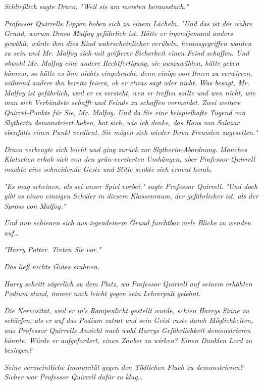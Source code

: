 {\emph{Schließlich sagte Draco, "Weil sie am meisten herausstach."}

\emph{Professor Quirrells Lippen hoben sich zu einem Lächeln. "Und das ist der wahre Grund, warum Draco Malfoy gefährlich ist. Hätte er irgendjemand anders gewählt, würde ihm dies Kind wahrscheinlicher verübeln, herausgegriffen worden zu sein und Mr. Malfoy sich mit größerer Sicherheit einen Feind schaffen. Und obwohl Mr. Malfoy eine andere Rechtfertigung, sie auszuwählen, hätte geben können, so hätte es ihm nichts eingebracht, denn einige von Ihnen zu verwirren, während andere ihn bereits feiern, ob er etwas sagt oder nicht. Was besagt, Mr. Malfoy ist gefährlich, weil er es versteht, wen er treffen sollte und wen nicht, wie man sich Verbündete schafft und Feinde zu schaffen vermeidet. Zwei weitere Quirrel-Punkte für Sie, Mr. Malfoy. Und da Sie eine beispielhafte Tugend von Slytherin demonstriert haben, hat sich, wie ich denke, das Haus von Salazar ebenfalls einen Punkt verdient. Sie mögen sich wieder Ihren Freunden zugesellen."}

\emph{Draco verbeugte sich leicht und ging zurück zur Slytherin-Abordnung. Manches Klatschen erhob sich von den grün-verzierten Umhängen, aber Professor Quirrell machte eine schneidende Geste und Stille senkte sich erneut herab.}

\emph{"Es mag scheinen, als sei unser Spiel vorbei," sagte Professor Quirrell.} \emph{"Und doch gibt es einen einzigen Schüler in diesem Klassenraum, der gefährlicher ist, als der Spross von Malfoy."}

\emph{Und} \emph{\emph{nun}} \emph{schienen sich aus irgendeinem Grund furchtbar viele Blicke zu wenden auf…}

\emph{"Harry Potter. Treten Sie vor."}

\emph{Das ließ nichts Gutes erahnen.}

\emph{Harry schritt zögerlich zu dem Platz, wo Professor Quirrell auf seinem erhöhten Podium stand, immer noch leicht gegen sein Lehrerpult gelehnt.}

\emph{Die Nervosität, weil er in's Rampenlicht gestellt wurde, schien Harrys Sinne zu schärfen, als er auf das Podium zutrat und sein Geist raste durch Möglichkeiten, was Professor Quirrells Ansicht nach wohl Harrys Gefährlichkeit demonstrieren könnte. Würde er aufgefordert, einen Zauber zu wirken? Einen Dunklen Lord zu besiegen?}

\emph{Seine vermeintliche Immunität gegen den Tödlichen Fluch zu demonstrieren? Sicher war Professor Quirrell} \emph{\emph{dafür}} \emph{zu klug…}

}
